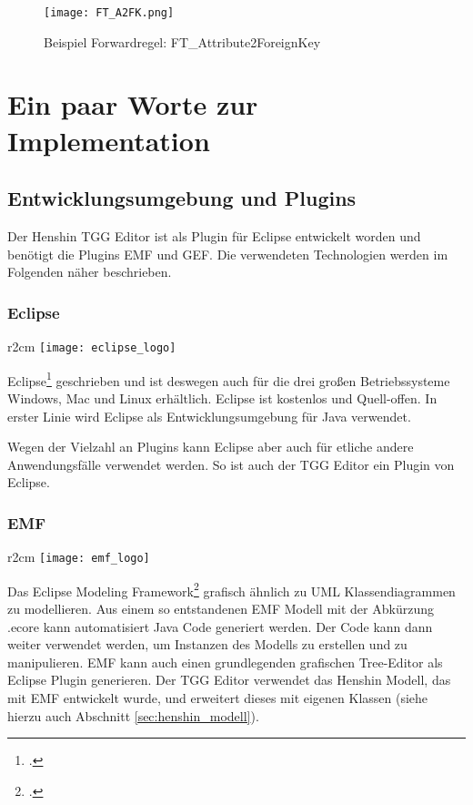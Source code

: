 \begin{figure}[h!]%
	\centering
	\texttt{[image: FT\_A2FK.png]}
	\caption{Beispiel Forwardregel: FT\_Attribute2ForeignKey}
	\label{fig:FT-Attribute2ForeignKey}
\end{figure}

\section{Ein paar Worte zur Implementation}\label{sec:implementation}
\subsection{Entwicklungsumgebung und Plugins}
Der Henshin TGG Editor ist als Plugin für Eclipse entwickelt worden und benötigt
die Plugins EMF und GEF. Die verwendeten Technologien werden im Folgenden
näher beschrieben.

\subsubsection{Eclipse}
\begin{wrapfigure}{r}{2cm}
	\centering
	\texttt{[image: eclipse\_logo]}
	\label{fig:eclipse_logo}
\end{wrapfigure}
Eclipse\footcite[][\url{http://www.eclipse.org/}]{eclipsewebsite}
geschrieben und ist deswegen auch für die drei großen Betriebssysteme Windows,
Mac und Linux erhältlich. Eclipse ist kostenlos und Quell-offen. In erster Linie
wird Eclipse als Entwicklungsumgebung für Java verwendet. 

Wegen der Vielzahl an Plugins kann Eclipse aber auch für etliche andere Anwendungsfälle verwendet werden. So ist auch der TGG Editor ein Plugin von Eclipse.

\subsubsection{EMF}
\begin{wrapfigure}{r}{2cm}
	\centering
	\texttt{[image: emf\_logo]}
	\label{fig:emf_logo}
\end{wrapfigure}
Das Eclipse Modeling Framework\footcite[][\url{http://www.eclipse.org/modeling/emf/}]{emfwebsite}
grafisch ähnlich zu UML Klassendiagrammen zu modellieren. Aus einem so
entstandenen EMF Modell mit der Abkürzung .ecore kann automatisiert Java Code
generiert werden. Der Code kann dann weiter verwendet werden, um Instanzen des
Modells zu erstellen und zu manipulieren. EMF kann auch einen grundlegenden
grafischen Tree-Editor als Eclipse Plugin generieren. Der TGG Editor verwendet
das Henshin Modell, das mit EMF entwickelt wurde, und erweitert dieses mit
eigenen Klassen (siehe hierzu auch Abschnitt \ref{sec:henshin_modell}).

